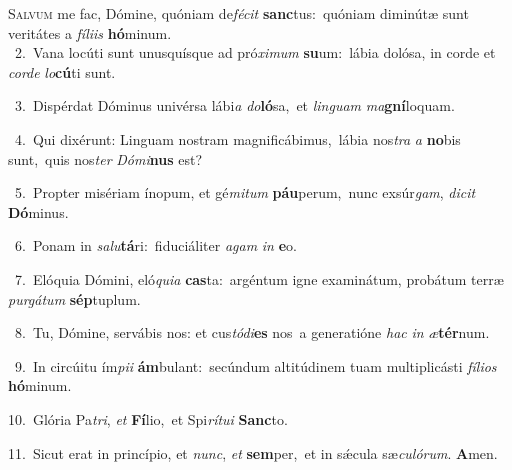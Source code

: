 \lettrine{\initial\textcolor{\initialcolor}{S}}{alvum} me fac, Dómine, quóniam de\-\textit{fé}\-\textit{cit} \textbf{sanc}\-tus:~\star quóniam diminútæ sunt veritátes a \textit{fí}\-\textit{li}\textit{is} \textbf{hó}\-minum.\\
{\numbfont\textcolor{\numbcolor}{~2.}}~Vana locúti sunt unusquísque ad pró\-\textit{xi}\-\textit{mum} \textbf{su}\-um:~\star lábia dolósa, in corde et \textit{cor}\-\textit{de} \textit{lo}\-\textbf{cú}ti sunt.\par
{\numbfont\textcolor{\numbcolor}{~3.}}~Dispérdat Dóminus univérsa lábi\textit{a} \textit{do}\-\textbf{ló}sa,~\star et \textit{lin}\-\textit{guam} \textit{ma}\-\textbf{gní}loquam.\par
{\numbfont\textcolor{\numbcolor}{~4.}}~Qui dixérunt: Linguam nostram magnificábimus,~\dagger lábia nos\textit{tra} \textit{a} \textbf{no}\-bis sunt,~\star quis nos\textit{ter} \textit{Dó}\-\textit{mi}\textbf{nus} est?\par
{\numbfont\textcolor{\numbcolor}{~5.}}~Propter misériam ínopum, et gé\-\textit{mi}\-\textit{tum} \textbf{páu}\-perum,~\star nunc exsúr\-\textit{gam}\-, \textit{di}\-\textit{cit} \textbf{Dó}\-minus.\par
{\numbfont\textcolor{\numbcolor}{~6.}}~Ponam in \textit{sa}\-\textit{lu}\textbf{tá}ri:~\star fiduciáliter \textit{a}\-\textit{gam} \textit{in} \textbf{e}\-o.\par
{\numbfont\textcolor{\numbcolor}{~7.}}~Elóquia Dómini, eló\-\textit{qui}\-\textit{a} \textbf{cas}\-ta:~\star argéntum igne examinátum, probátum terræ \textit{pur}\-\textit{gá}\textit{tum} \textbf{sép}\-tuplum.\par
{\numbfont\textcolor{\numbcolor}{~8.}}~Tu, Dómine, servábis nos: et cus\-\textit{tó}\-\textit{di}\textbf{es} nos~\star a generatióne \textit{hac} \textit{in} \textit{æ}\-\textbf{tér}num.\par
{\numbfont\textcolor{\numbcolor}{~9.}}~In circúitu ím\-\textit{pi}\-\textit{i} \textbf{ám}\-bulant:~\star secúndum altitúdinem tuam multiplicásti \textit{fí}\-\textit{li}\textit{os} \textbf{hó}\-minum.\par
{\numbfont\textcolor{\numbcolor}{10.}}~Glória Pa\-\textit{tri}\-, \textit{et} \textbf{Fí}\-lio,~\star et Spi\-\textit{rí}\-\textit{tu}\textit{i} \textbf{Sanc}\-to.\par
{\numbfont\textcolor{\numbcolor}{11.}}~Sicut erat in princípio, et \textit{nunc}\-, \textit{et} \textbf{sem}\-per,~\star et in sǽcula sæ\-\textit{cu}\-\textit{ló}\textit{rum}. \textbf{A}\-men.\par
